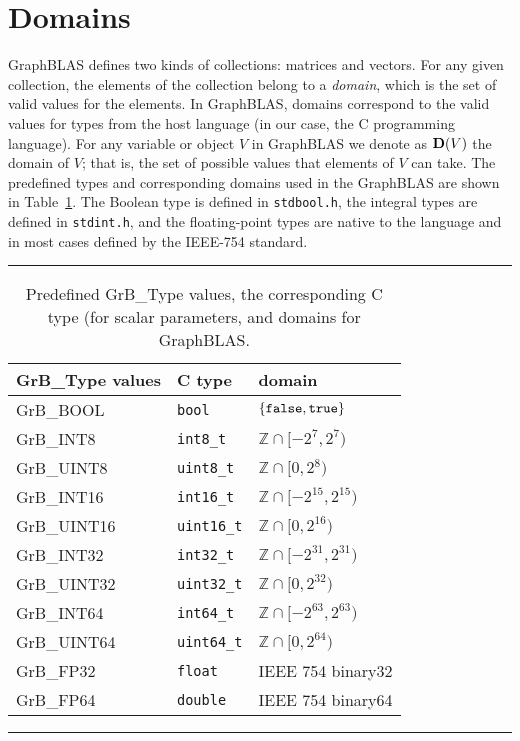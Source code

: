 \section{Domains}

GraphBLAS defines two kinds of collections: matrices and vectors.
For any given collection, the elements of the collection belong to
a \emph{domain}, which is the set of valid values for the elements.
In GraphBLAS, domains correspond to the valid values for types from
the host language (in our case, the C programming language).  For any
variable or object $V$ in GraphBLAS we denote as $\bold{D}(V)$ the
domain of $V$; that is, the set of possible values that elements of
$V$ can take.  The predefined types and corresponding domains used in the 
GraphBLAS are shown in Table~\ref{Tab:PredefinedTypes}.  The Boolean
type is defined in {\tt stdbool.h}, the integral types are defined in
{\tt stdint.h}, and the floating-point types are native to the language
and in most cases defined by the IEEE-754 standard.


\begin{table}
\hrule
\begin{center}
\caption{Predefined {\sf GrB\_Type} values, the corresponding C type (for scalar
parameters, and domains for GraphBLAS.}
\label{Tab:PredefinedTypes}
\begin{tabular}{l|l|l}
{\sf GrB\_Type values} & C type            & domain \\
\hline
{\sf GrB\_BOOL}        & {\tt bool}        & $\{ {\tt false}, {\tt true} \}$  \\
{\sf GrB\_INT8}        & {\tt int8\_t}     & $\mathbb{Z} \cap [-2^{7},2^{7})$  \\
{\sf GrB\_UINT8}       & {\tt uint8\_t}    & $\mathbb{Z} \cap [0,2{^8})$  \\
{\sf GrB\_INT16}       & {\tt int16\_t}    & $\mathbb{Z} \cap [-2^{15},2^{15})$ \\
{\sf GrB\_UINT16}      & {\tt uint16\_t}   & $\mathbb{Z} \cap [0,2^{16})$ \\
{\sf GrB\_INT32}       & {\tt int32\_t}    & $\mathbb{Z} \cap [-2^{31},2^{31})$ \\
{\sf GrB\_UINT32}      & {\tt uint32\_t}   & $\mathbb{Z} \cap [0,2^{32})$ \\
{\sf GrB\_INT64}       & {\tt int64\_t}    & $\mathbb{Z} \cap [-2^{63},2^{63})$ \\
{\sf GrB\_UINT64}      & {\tt uint64\_t}   & $\mathbb{Z} \cap [0,2^{64})$ \\
{\sf GrB\_FP32}        & {\tt float}       & IEEE 754 {\sf binary32}  \\
{\sf GrB\_FP64}        & {\tt double}      & IEEE 754 {\sf binary64}  \\
\end{tabular}
\end{center}
\hrule
\end{table}

